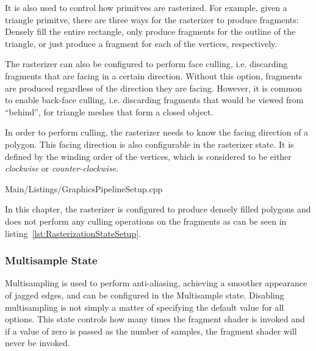         It is also used to control how primitves are rasterized.
        For example, given a triangle primitve, there are three ways for the rasterizer to produce fragments: Densely fill the entire rectangle, only produce fragments for the outline of the triangle, or just produce a fragment for each of the vertices, respectively.

        The rasterizer can also be configured to perform face culling, i.e. discarding fragments that are facing in a certain direction.
        Without this option, fragments are produced regardless of the direction they are facing.
        However, it is common to enable back-face culling, i.e. discarding fragments that would be viewed from ``behind'', for triangle meshes that form a closed object.

        In order to perform culling, the rasterizer needs to know the facing direction of a polygon.
        This facing direction is also configurable in the rasterizer state.
        It is defined by the winding order of the vertices, which is considered to be either \textit{clockwise} or \textit{counter-clockwise}.

        
        {Main/Listings/GraphicsPipelineSetup.cpp}


        In this chapter, the rasterizer is configured to produce densely filled polygons and does not perform any culling operations on the fragments as can be seen in listing~\ref{lst:RasterizationStateSetup}.

      \subsubsection{Multisample State}
        \label{subsubsec:MultisampleState}
        Multisampling is used to perform anti-aliasing, achieving a smoother appearance of jagged edges, and can be configured in the Multisample state.
        Disabling multisampling is not simply a matter of specifying the default value for all options.
        This state controls how many times the fragment shader is invoked and if a value of zero is passed as the number of samples, the fragment shader will never be invoked.

